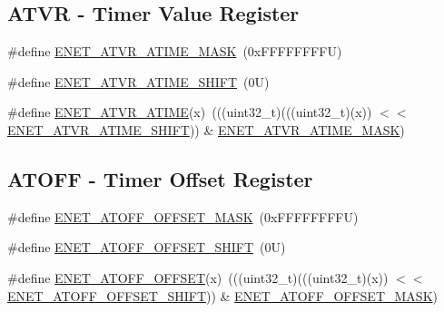 \subsection*{A\+T\+VR -\/ Timer Value Register}
\begin{DoxyCompactItemize}
\item 
\#define \mbox{\hyperlink{group___e_n_e_t___register___masks_ga2714eeb8f8fc55584ae1f08903279268}{E\+N\+E\+T\+\_\+\+A\+T\+V\+R\+\_\+\+A\+T\+I\+M\+E\+\_\+\+M\+A\+SK}}~(0x\+F\+F\+F\+F\+F\+F\+F\+F\+U)
\item 
\#define \mbox{\hyperlink{group___e_n_e_t___register___masks_gaf39338513eb4396791bd615bac83c136}{E\+N\+E\+T\+\_\+\+A\+T\+V\+R\+\_\+\+A\+T\+I\+M\+E\+\_\+\+S\+H\+I\+FT}}~(0\+U)
\item 
\#define \mbox{\hyperlink{group___e_n_e_t___register___masks_gaccf108190376691ed3da804f145e3371}{E\+N\+E\+T\+\_\+\+A\+T\+V\+R\+\_\+\+A\+T\+I\+ME}}(x)~(((uint32\+\_\+t)(((uint32\+\_\+t)(x)) $<$$<$ \mbox{\hyperlink{group___e_n_e_t___register___masks_gaf39338513eb4396791bd615bac83c136}{E\+N\+E\+T\+\_\+\+A\+T\+V\+R\+\_\+\+A\+T\+I\+M\+E\+\_\+\+S\+H\+I\+FT}})) \& \mbox{\hyperlink{group___e_n_e_t___register___masks_ga2714eeb8f8fc55584ae1f08903279268}{E\+N\+E\+T\+\_\+\+A\+T\+V\+R\+\_\+\+A\+T\+I\+M\+E\+\_\+\+M\+A\+SK}})
\end{DoxyCompactItemize}
\subsection*{A\+T\+O\+FF -\/ Timer Offset Register}
\begin{DoxyCompactItemize}
\item 
\#define \mbox{\hyperlink{group___e_n_e_t___register___masks_ga71beb7d6b82e503c872b4ca86033742d}{E\+N\+E\+T\+\_\+\+A\+T\+O\+F\+F\+\_\+\+O\+F\+F\+S\+E\+T\+\_\+\+M\+A\+SK}}~(0x\+F\+F\+F\+F\+F\+F\+F\+F\+U)
\item 
\#define \mbox{\hyperlink{group___e_n_e_t___register___masks_ga6ee3bf7413489ccf980bb573591e692e}{E\+N\+E\+T\+\_\+\+A\+T\+O\+F\+F\+\_\+\+O\+F\+F\+S\+E\+T\+\_\+\+S\+H\+I\+FT}}~(0\+U)
\item 
\#define \mbox{\hyperlink{group___e_n_e_t___register___masks_ga5cf0d0c54f14f61d08d74f45edae8b40}{E\+N\+E\+T\+\_\+\+A\+T\+O\+F\+F\+\_\+\+O\+F\+F\+S\+ET}}(x)~(((uint32\+\_\+t)(((uint32\+\_\+t)(x)) $<$$<$ \mbox{\hyperlink{group___e_n_e_t___register___masks_ga6ee3bf7413489ccf980bb573591e692e}{E\+N\+E\+T\+\_\+\+A\+T\+O\+F\+F\+\_\+\+O\+F\+F\+S\+E\+T\+\_\+\+S\+H\+I\+FT}})) \& \mbox{\hyperlink{group___e_n_e_t___register___masks_ga71beb7d6b82e503c872b4ca86033742d}{E\+N\+E\+T\+\_\+\+A\+T\+O\+F\+F\+\_\+\+O\+F\+F\+S\+E\+T\+\_\+\+M\+A\+SK}})
\end{DoxyCompactItemize}
